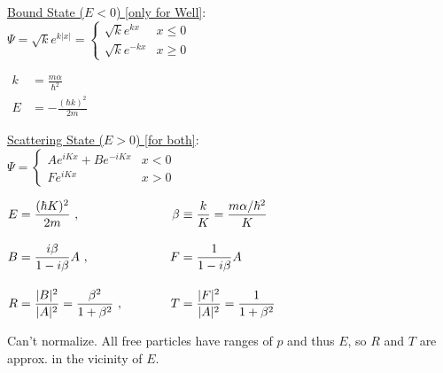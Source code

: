 \documentclass[12pt]{article}
\begin{document}
\vspace{25pt} \noindent
\begin{minipage}[t]{.45\textwidth}
    \setlength{\parindent}{.5cm}
    \noindent
    \underline{Bound State (\(E<0\)) {\scriptsize[only for Well]}}: \\[10pt]
    \indent \( \Psi = \sqrt{k} e^{k|x|} = \begin{cases} 
        \sqrt{k} e^{kx}  &   x \leq 0\\
        \sqrt{k} e^{-kx} &   x \geq 0
    \end{cases}\)
    
    \vspace{20pt} \noindent
    \(\begin{aligned}
        k &= \frac{m \alpha}{\hbar^2}\\[5pt]
        E &= - \frac{(\hbar k)^2}{2m}
    \end{aligned}\)    
\end{minipage}
\begin{minipage}[t]{.5\textwidth}
    \setlength{\parindent}{.5cm}
    \noindent
    \underline{Scattering State (\(E>0\)) {\scriptsize[for both]}}:\\[10pt] 
    \indent \(\Psi = \begin{cases}
        A e^{iKx} + B e^{-iKx}  &   x < 0\\
        F e^{iKx}               &   x > 0
    \end{cases}\)
    
    \vspace{20pt} \noindent
    \(\begin{aligned}
        E &= \frac{(\hbar K)^2}{2m} \ , & 
            \beta &\equiv \frac{k}{K} = \frac{m \alpha / \hbar^2}{K}\\[10pt]
        B &= \frac{i\beta}{1 - i\beta} A \ , &
            F &= \frac{1}{1- i\beta} A\\[10pt]
        R &= \frac{|B|^2}{|A|^2} = \frac{\beta^2}{1+\beta^2} \ , & \indent \indent
            T &= \frac{|F|^2}{|A|^2} = \frac{1}{1+\beta^2}
    \end{aligned}\)    

    \vspace{20pt} \noindent
    {\scriptsize Can't normalize. 
    All free particles have ranges of \(p\) and thus \(E\), so \(R\) and \(T\) are approx.
    in the vicinity of \(E\).}
\end{minipage}

\end{document}
